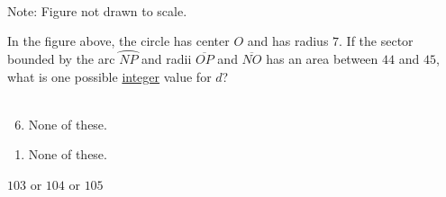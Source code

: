  
\begin{center}\\
Note: Figure not drawn to scale.
\end{center}
In the figure above, the circle has center $O$ and has radius $7$.  If the sector bounded by the arc $\wideparen{NP}$ and radii $\overline{OP}$ and $\overline{NO}$ has an area between $44$ and $45$, what is one possible \underline{integer} value for $d$?
\\\\


\ifsat
	\begin{enumerate}[label=\Alph*)]
	\end{enumerate}
\else
\fi

\ifacteven
	\begin{enumerate}[label=\textbf{\Alph*.},itemsep=\fill,align=left]
		\setcounter{enumii}{5}
		\item None of these. 
	\end{enumerate}
\else
\fi

\ifactodd
	\begin{enumerate}[label=\textbf{\Alph*.},itemsep=\fill,align=left]
		\item None of these. 
	\end{enumerate}
\else
\fi

\ifgridin
$103$ or $104$ or $105$
\else
\fi

